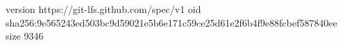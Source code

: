 version https://git-lfs.github.com/spec/v1
oid sha256:9e565243ed503bc9d59021e5b6e171c59ce25d61e2f6b4f9e88fcbef587840ee
size 9346
